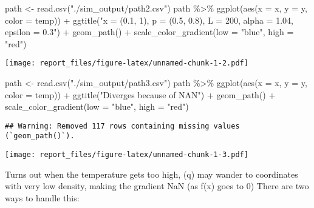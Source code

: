 \documentclass[
]{article}
\newenvironment{Shaded}{\begin{snugshade}}{\end{snugshade}}
\newcommand{\AttributeTok}[1]{\textcolor[rgb]{0.77,0.63,0.00}{#1}}
\newcommand{\FunctionTok}[1]{\textcolor[rgb]{0.00,0.00,0.00}{#1}}
\newcommand{\NormalTok}[1]{#1}
\newcommand{\OtherTok}[1]{\textcolor[rgb]{0.56,0.35,0.01}{#1}}
\newcommand{\SpecialCharTok}[1]{\textcolor[rgb]{0.00,0.00,0.00}{#1}}
\newcommand{\StringTok}[1]{\textcolor[rgb]{0.31,0.60,0.02}{#1}}
\begin{document}
\begin{Shaded}
\begin{Highlighting}[]
\NormalTok{path }\OtherTok{\textless{}{-}} \FunctionTok{read.csv}\NormalTok{(}\StringTok{"./sim\_output/path2.csv"}\NormalTok{)}
\NormalTok{path }\SpecialCharTok{\%\textgreater{}\%}
    \FunctionTok{ggplot}\NormalTok{(}\FunctionTok{aes}\NormalTok{(}\AttributeTok{x =}\NormalTok{ x, }\AttributeTok{y =}\NormalTok{ y, }\AttributeTok{color =}\NormalTok{ temp)) }\SpecialCharTok{+}
    \FunctionTok{ggtitle}\NormalTok{(}\StringTok{"x = (0.1, 1), p = (0.5, 0.8), L = 200, alpha = 1.04, epsilon = 0.3"}\NormalTok{) }\SpecialCharTok{+}
    \FunctionTok{geom\_path}\NormalTok{() }\SpecialCharTok{+} \FunctionTok{scale\_color\_gradient}\NormalTok{(}\AttributeTok{low =} \StringTok{"blue"}\NormalTok{, }\AttributeTok{high =} \StringTok{"red"}\NormalTok{)}
\end{Highlighting}
\end{Shaded}

\texttt{[image: report\_files/figure-latex/unnamed-chunk-1-2.pdf]}

\begin{Shaded}
\begin{Highlighting}[]
\NormalTok{path }\OtherTok{\textless{}{-}} \FunctionTok{read.csv}\NormalTok{(}\StringTok{"./sim\_output/path3.csv"}\NormalTok{)}
\NormalTok{path }\SpecialCharTok{\%\textgreater{}\%}
    \FunctionTok{ggplot}\NormalTok{(}\FunctionTok{aes}\NormalTok{(}\AttributeTok{x =}\NormalTok{ x, }\AttributeTok{y =}\NormalTok{ y, }\AttributeTok{color =}\NormalTok{ temp)) }\SpecialCharTok{+}
    \FunctionTok{ggtitle}\NormalTok{(}\StringTok{"Diverges because of NAN"}\NormalTok{) }\SpecialCharTok{+}
    \FunctionTok{geom\_path}\NormalTok{() }\SpecialCharTok{+} \FunctionTok{scale\_color\_gradient}\NormalTok{(}\AttributeTok{low =} \StringTok{"blue"}\NormalTok{, }\AttributeTok{high =} \StringTok{"red"}\NormalTok{)}
\end{Highlighting}
\end{Shaded}

\begin{verbatim}
## Warning: Removed 117 rows containing missing values (`geom_path()`).
\end{verbatim}

\texttt{[image: report\_files/figure-latex/unnamed-chunk-1-3.pdf]}

Turns out when the temperature gets too high, (q) may wander to
coordinates with very low density, making the gradient NaN (as f(x) goes
to 0) There are two ways to handle this:
\end{document}
